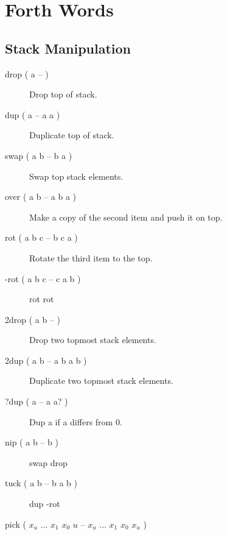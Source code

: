 \chapter{Forth Words}

\section{Stack Manipulation}

\begin{description}


\item[drop ( a -- )]

Drop top of stack.

\item[dup ( a -- a a )]

Duplicate top of stack.

\item[swap ( a b -- b a )]

Swap top stack elements.

\item[over ( a b -- a b a )]

Make a copy of the second item and push it on top.

\item[rot ( a b c -- b c a )]

Rotate the third item to the top.

\item[-rot ( a b c -- c a b )]

rot rot

\item[2drop ( a b -- )]

Drop two topmost stack elements.

\item[2dup ( a b -- a b a b )]

Duplicate two topmost stack elements.

\item[?dup ( a -- a a? )]

Dup a if a differs from 0.

\item[nip ( a b -- b )]

swap drop

\item[tuck ( a b -- b a b )]

dup -rot

\item[pick ( $x_u$ ... $x_1$ $x_0$ $u$ -- $x_u$ ... $x_1$ $x_0$ $x_u$ )]


\end{description}
